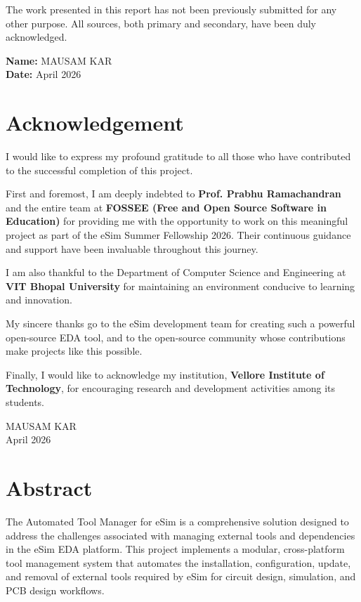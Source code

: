 \documentclass[12pt,a4paper]{report}
\begin{document}
The work presented in this report has not been previously submitted for any other purpose. All sources, both primary and secondary, have been duly acknowledged.

\vskip 2cm

\begin{flushleft}
\textbf{Name:} MAUSAM KAR \\
\textbf{Date:} April 2026
\end{flushleft}

\chapter*{Acknowledgement}
I would like to express my profound gratitude to all those who have contributed to the successful completion of this project.

First and foremost, I am deeply indebted to \textbf{Prof. Prabhu Ramachandran} and the entire team at \textbf{FOSSEE (Free and Open Source Software in Education)} for providing me with the opportunity to work on this meaningful project as part of the eSim Summer Fellowship 2026. Their continuous guidance and support have been invaluable throughout this journey.

I am also thankful to the Department of Computer Science and Engineering at \textbf{VIT Bhopal University} for maintaining an environment conducive to learning and innovation.

My sincere thanks go to the eSim development team for creating such a powerful open-source EDA tool, and to the open-source community whose contributions make projects like this possible.

Finally, I would like to acknowledge my institution, \textbf{Vellore Institute of Technology}, for encouraging research and development activities among its students.

\vskip 1cm

\begin{flushright}
MAUSAM KAR \\
April 2026
\end{flushright}

\chapter*{Abstract}
The Automated Tool Manager for eSim is a comprehensive solution designed to address the challenges associated with managing external tools and dependencies in the eSim EDA platform. This project implements a modular, cross-platform tool management system that automates the installation, configuration, update, and removal of external tools required by eSim for circuit design, simulation, and PCB design workflows.
\end{document}
